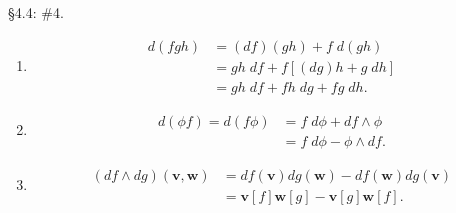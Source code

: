 \documentclass[10pt]{report}
\begin{document}
\begin{exer}[]
\S 4.4: \#4.
\end{exer}
\begin{enumerate}
	\item 
		\begin{align*}
			d(fgh) &= (df)(gh) + f\;d(gh) \\
			       &= gh \; df + f\left[ (dg)h+g\;dh \right] \\
			       &= gh\;df + fh\;dg + fg\;dh.
		\end{align*}

	\item 
		\begin{align*}
			d(\phi f) = d\left( f\phi \right)&= f\;d\phi+df\wedge \phi \\
				  &= f\;d\phi-\phi\wedge df.
		\end{align*}

	\item 
		\begin{align*}
			(df\wedge dg)(\mathbf{v},\mathbf{w}) &= df(\mathbf{v})dg(\mathbf{w}) - df(\mathbf{w})dg(\mathbf{v}) \\
							     &= \mathbf{v}[f] \mathbf{w}[g]-\mathbf{v}[g]\mathbf{w}[f].
		\end{align*}
\end{enumerate}
\end{document}
